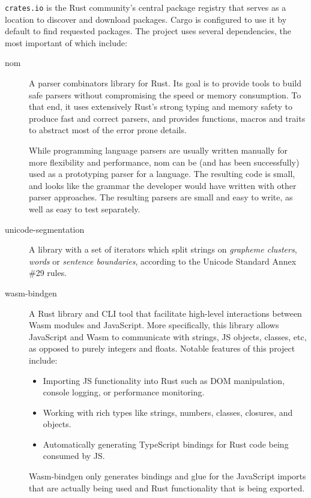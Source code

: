 \documentclass[english,engineering]{wizthesis}
\newcommand{\paraphrase}[1]{#1}
\begin{document}
\texttt{crates.io} \paraphrase{is the Rust community's central package registry
that serves as a location to discover and download packages. Cargo is configured
to use it by default to find requested packages.} The project uses several
dependencies, the most important of which include:
\begin{description}
  \item[nom] \cite{nom,couprie-2015} \paraphrase{A parser combinators library for Rust. Its
  goal is to provide tools to build safe parsers without compromising the speed
  or memory consumption. To that end, it uses extensively Rust's strong typing
  and memory safety to produce fast and correct parsers, and provides functions,
  macros and traits to abstract most of the error prone details.
  
  While programming language parsers are usually written manually for more
  flexibility and performance, nom can be (and has been successfully) used as a
  prototyping parser for a language. The resulting code is small, and looks like
  the grammar the developer would have written with other parser approaches. The
  resulting parsers are small and easy to write, as well as easy to test
  separately.}
  \item[unicode-segmentation] \cite{unicode-segmentation} A library with a set
  of iterators which split strings on \emph{grapheme clusters}, \emph{words} or
  \emph{sentence boundaries}, according to the Unicode Standard Annex \#29
  \cite{unicode-standard-annex-29} rules.
  \item[wasm-bindgen] \cite{wasm-bindgen} \paraphrase{A Rust library and CLI
  tool that facilitate high-level interactions between Wasm modules and
  JavaScript. More specifically, this library allows JavaScript and Wasm to
  communicate with strings, JS objects, classes, etc, as opposed to purely
  integers and floats. Notable features of this project include:
  \begin{itemize}
    \item Importing JS functionality into Rust such as DOM manipulation, console
    logging, or performance monitoring.
    \item Working with rich types like strings, numbers, classes, closures, and
    objects.
    \item Automatically generating TypeScript bindings for Rust code being
    consumed by JS.
  \end{itemize}
  Wasm-bindgen only generates bindings and glue for the JavaScript imports that
  are actually being used and Rust functionality that is being exported.}

\end{description}
\end{document}
